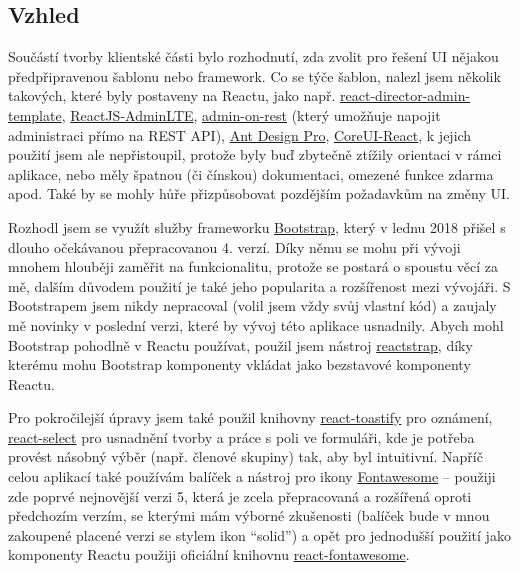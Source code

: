     \subsection{Vzhled}
    Součástí tvorby klientské části bylo rozhodnutí, zda zvolit pro řešení UI nějakou předpřipravenou šablonu nebo framework. Co se týče šablon, nalezl jsem několik takových, které byly postaveny na Reactu, jako např. \href{https://github.com/MacKentoch/react-director-admin-template}{react-director-admin-template}, \href{https://github.com/booleanhunter/ReactJS-AdminLTE}{ReactJS-AdminLTE},
    \href{https://github.com/marmelab/admin-on-rest}{admin-on-rest} (který umožňuje napojit administraci přímo na REST API),
    \href{https://github.com/ant-design/ant-design-pro/}{Ant Design Pro},
    \href{https://github.com/mrholek/CoreUI-React}{CoreUI-React}, k jejich použití jsem ale nepřistoupil, protože byly buď zbytečně ztížily orientaci v rámci aplikace, nebo měly špatnou (či čínskou) dokumentaci, omezené funkce zdarma apod. Také by se mohly hůře přizpůsobovat pozdějším požadavkům na změny UI.
    
    Rozhodl jsem se využít služby frameworku \href{https://getbootstrap.com}{Bootstrap}, který v lednu 2018 přišel s dlouho očekávanou přepracovanou 4. verzí. Díky němu se mohu při vývoji mnohem hlouběji zaměřit na funkcionalitu, protože se postará o spoustu věcí za mě, dalším důvodem použití je také jeho popularita a rozšířenost \cite{bootstrap} mezi vývojáři. S Bootstrapem jsem nikdy nepracoval (volil jsem vždy svůj vlastní kód) a zaujaly mě novinky v poslední verzi, které by vývoj této aplikace usnadnily. Abych mohl Bootstrap pohodlně v Reactu používat, použil jsem nástroj \href{https://github.com/reactstrap/reactstrap}{reactstrap}, díky kterému mohu Bootstrap komponenty vkládat jako bezstavové komponenty Reactu.
    
    Pro pokročilejší úpravy jsem také použil knihovny \href{https://github.com/fkhadra/react-toastify}{react-toastify} pro oznámení, \href{https://github.com/JedWatson/react-select}{react-select} pro usnadnění tvorby a práce s poli ve formuláři, kde je potřeba provést násobný výběr (např. členové skupiny) tak, aby byl intuitivní. Napříč celou aplikací také používám balíček a nástroj pro ikony \href{https://fontawesome.com/}{Fontawesome} -- použiji zde poprvé nejnovější verzi 5, která je zcela přepracovaná a rozšířená oproti předchozím verzím, se kterými mám výborné zkušenosti (balíček bude v mnou zakoupené placené verzi se stylem ikon \enquote{solid}) a opět pro jednodušší použití jako komponenty Reactu použiji oficiální knihovnu \href{https://github.com/FortAwesome/react-fontawesome}{react-fontawesome}.
    
